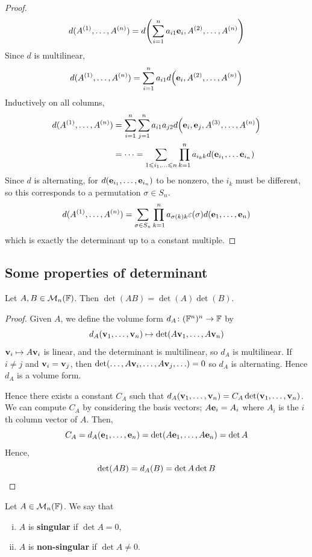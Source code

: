 \documentclass[a4paper]{article}
\begin{document}
\begin{proof}
	\[
		d(A^{(1)}, \dots, A^{(n)}) = d\qty(\sum_{i=1}^n a_{i1} {\bf e}_i, A^{(2)}, \dots, A^{(n)})
	\]
	Since $ d $ is multilinear,
	\[
		d(A^{(1)}, \dots, A^{(n)}) = \sum_{i=1}^n a_{i1} d\qty({\bf e}_i, A^{(2)}, \dots, A^{(n)})
	\]
	Inductively on all columns,
	\begin{align*}
		d(A^{(1)}, \dots, A^{(n)}) &= \sum_{i=1}^n \sum_{j=1}^n a_{i1} a_{j2} d\qty(\bfe_i, \bfe_j, A^{(3)}, \dots, A^{(n)}) \\ 
		&= \dots = \sum_{1 \leq i_1, \dots \leq n} \prod_{k=1}^n a_{i_k k} d(\bfe_{i_1}, \dots \bfe_{i_n})
	\end{align*}
	Since $ d $ is alternating, for $ d({\bf e}_{i_1}, \dots, {\bf e}_{i_n}) $ to be nonzero, the $ i_k $ must be different, so this corresponds to a permutation $ \sigma \in S_n $.
	\[
		d(A^{(1)}, \dots, A^{(n)}) = \sum_{\sigma \in S_n} \prod_{k=1}^n a_{\sigma(k) k} \varepsilon(\sigma) d({\bf e}_1, \dots, {\bf e}_n)
	\]
	which is exactly the determinant up to a constant multiple.
\end{proof}

\subsection{Some properties of determinant}

\begin{lemma}
	Let $ A, B \in {\mathcal{M}}_n({\mathbb{F}}) $.
	Then $ \det(AB) = \det(A) \det(B) $.
\end{lemma}
\begin{proof}
	Given $ A $, we define the volume form $ d_A \colon ({\mathbb{F}}^n)^n \to {\mathbb{F}} $ by
	\[
		d_A({\bf v}_1, \dots, {\bf v}_n) \mapsto \det(A {\bf v}_1, \dots, A {\bf v}_n)
	\]
	$ {\bf v}_i \mapsto A {\bf v}_i $ is linear, and the determinant is multilinear, so $ d_A $ is multilinear.
	If $ i \neq j $ and $ {\bf v}_i = {\bf v}_j $, then $ \det(\dots, A {\bf v}_i, \dots, A {\bf v}_j, \dots) = 0 $ so $ d_A $ is alternating.
	Hence $ d_A $ is a volume form.

	Hence there exists a constant $ C_A $ such that $ d_A({\bf v}_1, \dots, {\bf v}_n) = C_A \det({\bf v}_1, \dots, {\bf v}_n) $.
	We can compute $ C_A $ by considering the basis vectors; $ A {\bf e}_i = A_i $ where $ A_i $ is the $ i $th column vector of $ A $.
	Then,
	\[
		C_A = d_A({\bf e}_1, \dots, {\bf e}_n) = \det(A{\bf e}_1, \dots, A{\bf e}_n) = \det A
	\]
	Hence,
	\[
		\det(AB) = d_A(B) = \det A \det B\qedhere
	\]
\end{proof}

\begin{definition}
	Let $ A \in {\mathcal{M}}_n({\mathbb{F}}) $.
	We say that
	\begin{enumerate}[(i)]
		\item $ A $ is \textbf{singular} if $ \det A = 0 $,
		\item $ A $ is \textbf{non-singular} if $ \det A \neq 0 $.
	\end{enumerate}
\end{definition}
\end{document}
